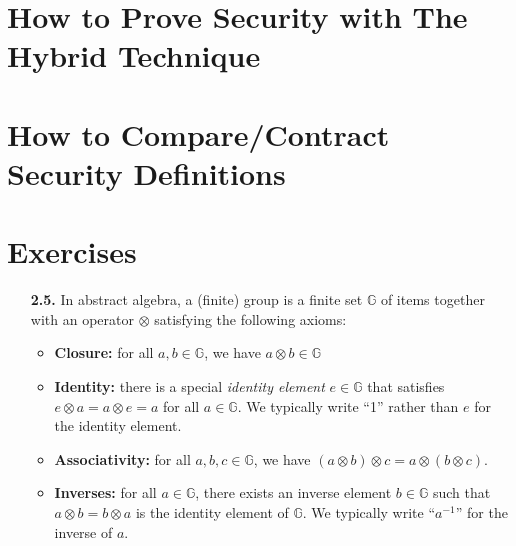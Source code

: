 \documentclass[12pt,openany]{book}
\theoremstyle{definition}
\newcommand{\G}{\mathbb{G}}
\begin{document}
	\section{How to Prove Security with The Hybrid Technique}
	\section{How to Compare/Contract Security Definitions}
	
	\newpage
	\section*{Exercises}
	
	\begin{itemize}
		\item[\bf 2.5.] In abstract algebra, a (finite) group is a finite set $\mathbb{G}$ of items together with an operator $\otimes$ satisfying the following axioms:
		\begin{itemize}
			\item \textbf{Closure:} for all \(a,b\in\mathbb{G}\), we have $a\otimes b\in \mathbb{G}$
			\item \textbf{Identity:} there is a special \textit{identity element} $e\in\G$ that satisfies \(e\otimes a = a\otimes e = a\) for
			all \(a\in\G\). We typically write ``1'' rather than $e$ for the identity element.
			\item \textbf{Associativity:} for all \(a, b, c\in\G\), we have \((a\otimes b)\otimes c = a\otimes (b\otimes c)\).
			\item \textbf{Inverses:} for all \(a\in\G\), there exists an inverse element \(b\in\G\) such that \(a\otimes b = b\otimes a\)
			is the identity element of $\G$. We typically write ``$a^{-1}$'' for the inverse of $a$.
		\end{itemize}
	

\end{itemize}
\end{document}
